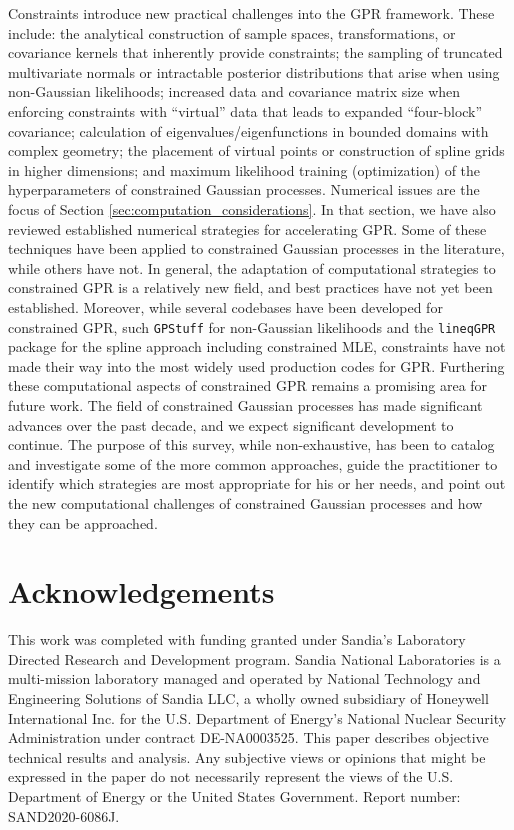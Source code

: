 Constraints introduce new practical challenges into the GPR framework. These include: the analytical construction of sample spaces, transformations, or covariance kernels that inherently provide constraints; the sampling of truncated multivariate normals or intractable posterior distributions that arise when using non-Gaussian likelihoods; increased data and covariance matrix size when enforcing constraints with ``virtual'' data that leads to expanded ``four-block'' covariance; calculation of eigenvalues/eigenfunctions in bounded domains with complex geometry; the placement of virtual points or construction of spline grids in higher dimensions; and maximum likelihood training (optimization) of the hyperparameters of constrained Gaussian processes. Numerical issues are the focus of Section \ref{sec:computation_considerations}. In that section, we have also reviewed established numerical strategies for accelerating GPR. Some of these techniques have been applied to constrained Gaussian processes in the literature, while others have not. In general, the adaptation of computational strategies to constrained GPR is a relatively new field, and best practices have not yet been established. Moreover, while several codebases have been developed for constrained GPR, such \texttt{GPStuff} for non-Gaussian likelihoods  and the \texttt{lineqGPR} package  for the spline approach including constrained MLE, constraints have not made their way into the most widely used production codes for GPR. Furthering these computational aspects of constrained GPR remains a promising area for future work. 
The field of constrained Gaussian processes has made significant advances over the past decade, and we expect significant development to continue. The purpose of this survey, while non-exhaustive, has been to catalog and investigate some of the more common approaches, guide the practitioner to identify which strategies are most appropriate for his or her needs, and point out the new computational challenges of constrained Gaussian processes and how they can be approached. 
\section*{Acknowledgements}
This work was completed with funding granted under Sandia's Laboratory Directed 
Research and Development program.
Sandia National Laboratories is a multi-mission laboratory managed and operated
by National Technology and Engineering Solutions of Sandia LLC, a wholly owned subsidiary of Honeywell International Inc. for the U.S. Department of Energy's 
National Nuclear Security Administration under contract {DE-NA0003525}. 
This paper describes objective technical results and analysis. Any subjective views or opinions that might be expressed in the paper do not necessarily represent the views of the U.S. Department of Energy or the United States Government. Report number: SAND2020-6086J. 

 

